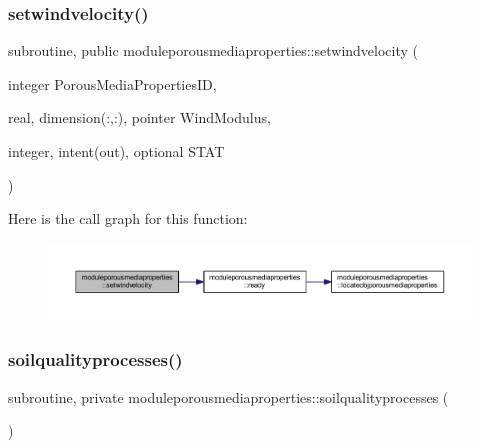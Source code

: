 \subsubsection{\texorpdfstring{setwindvelocity()}{setwindvelocity()}}
{\footnotesize\ttfamily subroutine, public moduleporousmediaproperties\+::setwindvelocity (\begin{DoxyParamCaption}\item[{integer}]{Porous\+Media\+Properties\+ID,  }\item[{real, dimension(\+:,\+:), pointer}]{Wind\+Modulus,  }\item[{integer, intent(out), optional}]{S\+T\+AT }\end{DoxyParamCaption})}

Here is the call graph for this function\+:\nopagebreak
\begin{figure}[H]
\begin{center}
\leavevmode
\includegraphics[width=350pt]{namespacemoduleporousmediaproperties_a3c0d671b8b697248b218443e59bb2cb8_cgraph}
\end{center}
\end{figure}
\mbox{\label{namespacemoduleporousmediaproperties_a2045bbe7b3450cd88b6aae4509fbe0c5}} 
\subsubsection{\texorpdfstring{soilqualityprocesses()}{soilqualityprocesses()}}
{\footnotesize\ttfamily subroutine, private moduleporousmediaproperties\+::soilqualityprocesses (\begin{DoxyParamCaption}{ }\end{DoxyParamCaption})\hspace{0.3cm}{\ttfamily [private]}}

